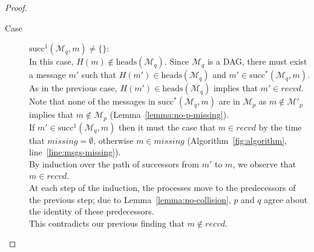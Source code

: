 \documentclass[a4paper,anonymous,USenglish]{lipics-v2019}
\begin{document}
\begin{proof}
\begin{description}
    \item[Case] $\mathrm{succ}^1(\mathcal{M}_q, m) \ne \{\}$:\\
    In this case, $H(m) \notin \mathrm{heads}(\mathcal{M}_q)$.
    Since $\mathcal{M}_q$ is a DAG, there must exist a message $m'$ such that $H(m') \in \mathrm{heads}(\mathcal{M}_q)$ and $m' \in \mathrm{succ}^*(\mathcal{M}_q, m)$.\\
    As in the previous case, $H(m') \in \mathrm{heads}(\mathcal{M}_q)$ implies that $m' \in \mathit{recvd}$.\\
    Note that none of the messages in $\mathrm{succ}^*(\mathcal{M}_q, m)$ are in $\mathcal{M}_p$ as $m \notin \mathcal{M}'_p$ implies that  $m \notin \mathcal{M}_p$ (Lemma~\ref{lemma:no-p-missing}).\\
    If $m' \in \mathrm{succ}^1(\mathcal{M}_q, m)$ then it must the case that $m \in \mathit{recvd}$ by the time that $\mathit{missing} = \emptyset$, otherwise $m \in \mathit{missing}$ (Algorithm~\ref{fig:algorithm}, line~\ref{line:msgs-missing}).\\
    By induction over the path of successors from $m'$ to $m$, we observe that $m \in \mathit{recvd}$.\\
    At each step of the induction, the processes move to the predecessors of the previous step; due to Lemma~\ref{lemma:no-collision}, $p$ and $q$ agree about the identity of these predecessors.\\
    This contradicts our previous finding that $m \notin \mathit{recvd}$.
\end{description}
\end{proof}
\end{document}
